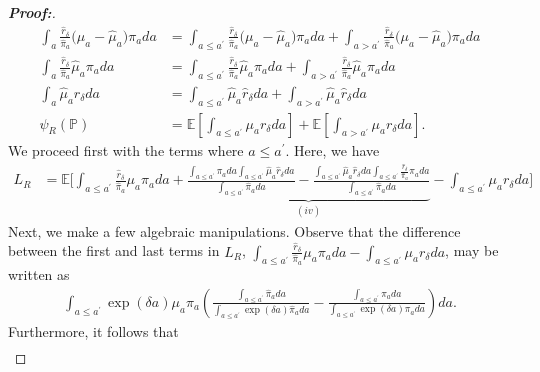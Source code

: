 \documentclass[11pt,twoside]{article}
\theoremstyle{definition}
\theoremstyle{remark}
\begin{document}
\begin{proof}[\textbf{Proof:}]
\begin{align*}
    \int_a \frac{\widehat{r}_\delta}{\widehat{\pi}_a} \Big(\mu_a - \widehat{\mu}_a \Big) \pi_a da &= \int_{a \leq a^{\prime}} \frac{\widehat{r}_\delta}{\widehat{\pi}_a} \Big(\mu_a - \widehat{\mu}_a \Big) \pi_a da + \int_{a > a^{\prime}} \frac{\widehat{r}_\delta}{\widehat{\pi}_a} \Big(\mu_a - \widehat{\mu}_a \Big) \pi_a da \\
     \int_a \frac{\widehat{r}_{\delta}}{\widehat{\pi}_a} \widehat{\mu}_a \pi_a da &=  \int_{a \leq a^{\prime}} \frac{\widehat{r}_{\delta}}{\widehat{\pi}_a} \widehat{\mu}_a \pi_a da +  \int_{a > a^{\prime}} \frac{\widehat{r}_{\delta}}{\widehat{\pi}_a} \widehat{\mu}_a \pi_a da \\
     \int_a \widehat{\mu}_a \widehat{r}_\delta da &= \int_{a \leq a^{\prime}} \widehat{\mu}_a \widehat{r}_\delta da + \int_{a > a^{\prime}} \widehat{\mu}_a \widehat{r}_\delta da \\
     \psi_R(\mathbb{P}) &= \mathbb{E}\left[ \int_{a \leq a^{\prime}} \mu_a r_{\delta} da \right] + \mathbb{E}\left[ \int_{a > a^{\prime}} \mu_a r_{\delta} da \right].
\end{align*}
We proceed first with the terms where $a \leq a^{\prime}$. Here, we have
\begin{align*}
   L_R &=  \mathbb{E} \Bigg[ \int_{a \leq a^{\prime}} \frac{\widehat{r}_\delta}{\widehat{\pi}_a} \mu_a \pi_a da  + \underbrace{\frac{ \int_{a \leq a^{\prime}}  \pi_a da \int_{a \leq a^{\prime}}  \widehat{\mu}_a \widehat{r}_\delta da}{\int_{a \leq a^{\prime}}  \widehat{\pi}_a da}   -  \frac{\int_{a \leq a^{\prime}}  \widehat{\mu}_a \widehat{r}_\delta da \int_{a \leq a^{\prime}} \frac{\widehat{r}_{\delta}  }{\widehat{\pi}_a} \pi_a da}{\int_{a \leq a^{\prime}}  \widehat{\pi}_a da} }_{(iv)} -\int_{a \leq a^{\prime}} \mu_a r_{\delta} da \Bigg]
\end{align*}
Next, we make a few algebraic manipulations. Observe that the difference between the first and last terms in $L_R$, $\int_{a \leq a^{\prime}} \frac{\widehat{r}_\delta}{\widehat{\pi}_a} \mu_a \pi_a da -\int_{a \leq a^{\prime}} \mu_a r_{\delta} da $, may be written as
\begin{align*}
     \int_{a \leq a^{\prime}} \exp(\delta a) \mu_a \pi_a \left( \frac{\int_{a \leq a^{\prime}} \widehat{\pi}_a da }{\int_{a \leq a^{\prime}} \exp(\delta a) \widehat{\pi}_a da } - \frac{\int_{a \leq a^{\prime}} \pi_a da}{\int_{a \leq a^{\prime}} \exp(\delta a) \pi_a da }\right) da.
\end{align*}
Furthermore, it follows that
\begin{align*}

\end{align*}
\end{proof}
\end{document}
